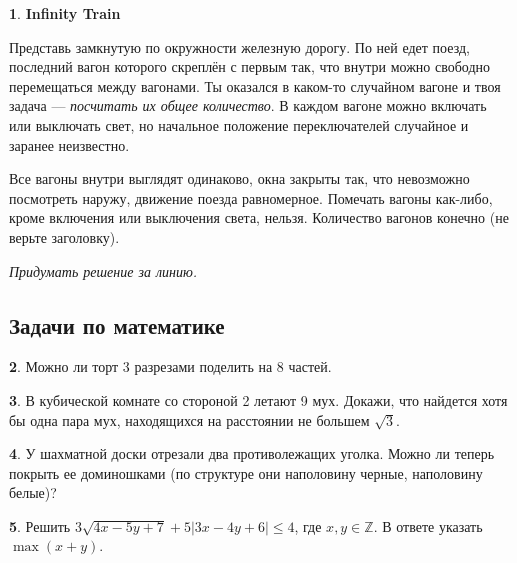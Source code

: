 \documentclass[14pt, a4paper]{extarticle}
\theoremstyle{definition}
\newtheorem{problem}{}
\theoremstyle{definition}
\theoremstyle{remark}
\numberwithin{equation}{section}
\newcommand{\Z}{\ensuremath{\mathbb{Z}}}
\begin{document}
\begin{problem}
    \textbf{Infinity Train}

    Представь замкнутую по окружности железную дорогу. 
    По ней едет поезд, последний вагон которого скреплён с первым так, 
    что внутри можно свободно перемещаться между вагонами. 
    Ты оказался в каком-то случайном вагоне и твоя задача — \textit{посчитать 
    их общее количество}. В каждом вагоне можно включать или выключать 
    свет, но начальное положение переключателей случайное и заранее неизвестно.

    Все вагоны внутри выглядят одинаково, окна закрыты так, что невозможно 
    посмотреть наружу, движение поезда равномерное. Помечать вагоны как-либо, 
    кроме включения или выключения света, нельзя. 
    Количество вагонов конечно (не верьте заголовку).

    \textit{Придумать решение за линию.}
\end{problem}

\subsection*{Задачи по математике}
\setcounter{problem}{0}

\begin{problem}
    Можно ли торт 3 разрезами поделить на 8 частей.
\end{problem}

\begin{problem}
    В кубической комнате со стороной 2 летают 9 мух. 
    Докажи, что найдется хотя бы одна пара мух, 
    находящихся на расстоянии не большем $\sqrt{3}$.
\end{problem}

\begin{problem}
    У шахматной доски отрезали два противолежащих уголка.
    Можно ли теперь покрыть ее доминошками (по структуре они
    наполовину черные, наполовину белые)?
\end{problem}

\begin{problem}
    Решить $3\sqrt{4x - 5y + 7} +
    5|3x - 4y + 6| \leqslant 4$, где $x, y \in \Z$.
    В ответе указать $\max(x+y)$.
\end{problem}
\end{document}

